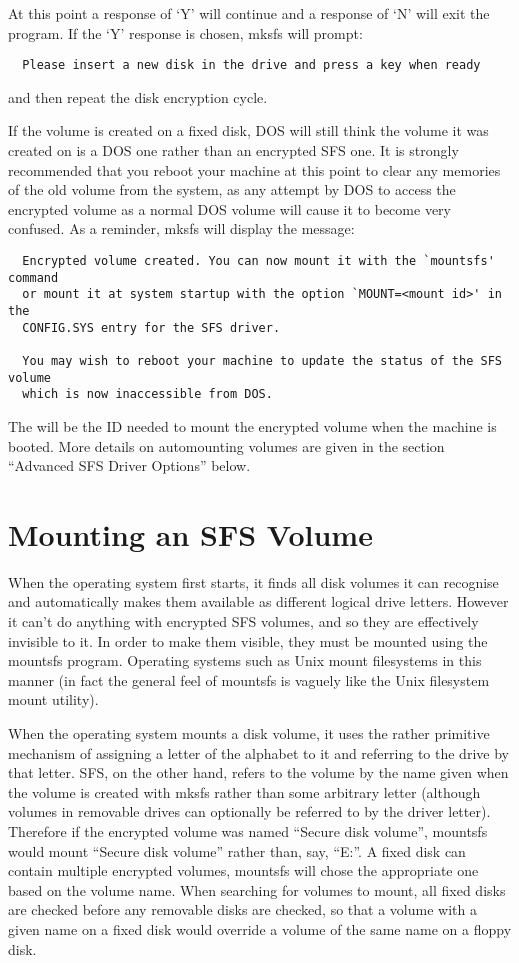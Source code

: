 At this point a response of `Y' will continue and a response of `N' will exit
the program.  If the `Y' response is chosen, mksfs will prompt:

{\tt \verb|  |Please insert a new disk in the drive and press a key when ready}

and then repeat the disk encryption cycle.

If the volume is created on a fixed disk, DOS will still think the volume it
was created on is a DOS one rather than an encrypted SFS one.  It is strongly
recommended that you reboot your machine at this point to clear any memories of
the old volume from the system, as any attempt by DOS to access the encrypted
volume as a normal DOS volume will cause it to become very confused.  As a
reminder, mksfs will display the message:
{\small
\begin{verbatim}
  Encrypted volume created. You can now mount it with the `mountsfs' command
  or mount it at system startup with the option `MOUNT=<mount id>' in the
  CONFIG.SYS entry for the SFS driver.

  You may wish to reboot your machine to update the status of the SFS volume
  which is now inaccessible from DOS.
\end{verbatim}
}
The {\tt <mount id>} will be the ID needed to mount the encrypted volume when the 
machine is booted.  More details on automounting volumes are given in the section 
``Advanced SFS Driver Options'' below.


\section{Mounting an SFS Volume}

When the operating system first starts, it finds all disk volumes it can
recognise and automatically makes them available as different logical drive
letters.  However it can't do anything with encrypted SFS volumes, and so they
are effectively invisible to it.  In order to make them visible, they must be
mounted using the mountsfs program.  Operating systems such as Unix mount
filesystems in this manner (in fact the general feel of mountsfs is vaguely
like the Unix filesystem mount utility).

When the operating system mounts a disk volume, it uses the rather primitive
mechanism of assigning a letter of the alphabet to it and referring to the
drive by that letter.  SFS, on the other hand, refers to the volume by the name
given when the volume is created with mksfs rather than some arbitrary letter
(although volumes in removable drives can optionally be referred to by the
driver letter).  Therefore if the encrypted volume was named ``Secure disk
volume'', mountsfs would mount ``Secure disk volume'' rather than, say, ``E:''.  A
fixed disk can contain multiple encrypted volumes, mountsfs will chose the
appropriate one based on the volume name.  When searching for volumes to mount,
all fixed disks are checked before any removable disks are checked, so that a
volume with a given name on a fixed disk would override a volume of the same
name on a floppy disk.

